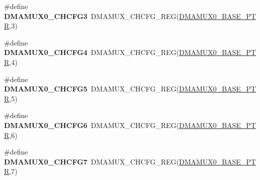 \begin{DoxyCompactItemize}
\item 
\hypertarget{group___d_m_a_m_u_x___register___accessor___macros_ga91901af15d28d4df4369689afa83ed91}{}\#define {\bfseries D\+M\+A\+M\+U\+X0\+\_\+\+C\+H\+C\+F\+G3}~D\+M\+A\+M\+U\+X\+\_\+\+C\+H\+C\+F\+G\+\_\+\+R\+E\+G(\hyperlink{group___d_m_a_m_u_x___peripheral_ga403b61d306820e4e1113c636300004a3}{D\+M\+A\+M\+U\+X0\+\_\+\+B\+A\+S\+E\+\_\+\+P\+T\+R},3)\label{group___d_m_a_m_u_x___register___accessor___macros_ga91901af15d28d4df4369689afa83ed91}

\item 
\hypertarget{group___d_m_a_m_u_x___register___accessor___macros_ga119cc51656d195aff24959e90f717d81}{}\#define {\bfseries D\+M\+A\+M\+U\+X0\+\_\+\+C\+H\+C\+F\+G4}~D\+M\+A\+M\+U\+X\+\_\+\+C\+H\+C\+F\+G\+\_\+\+R\+E\+G(\hyperlink{group___d_m_a_m_u_x___peripheral_ga403b61d306820e4e1113c636300004a3}{D\+M\+A\+M\+U\+X0\+\_\+\+B\+A\+S\+E\+\_\+\+P\+T\+R},4)\label{group___d_m_a_m_u_x___register___accessor___macros_ga119cc51656d195aff24959e90f717d81}

\item 
\hypertarget{group___d_m_a_m_u_x___register___accessor___macros_ga7fef97c2d0c1d43756b5da924f27ff86}{}\#define {\bfseries D\+M\+A\+M\+U\+X0\+\_\+\+C\+H\+C\+F\+G5}~D\+M\+A\+M\+U\+X\+\_\+\+C\+H\+C\+F\+G\+\_\+\+R\+E\+G(\hyperlink{group___d_m_a_m_u_x___peripheral_ga403b61d306820e4e1113c636300004a3}{D\+M\+A\+M\+U\+X0\+\_\+\+B\+A\+S\+E\+\_\+\+P\+T\+R},5)\label{group___d_m_a_m_u_x___register___accessor___macros_ga7fef97c2d0c1d43756b5da924f27ff86}

\item 
\hypertarget{group___d_m_a_m_u_x___register___accessor___macros_gaf889f0ccfcec8a453b59b14b3e17d8ec}{}\#define {\bfseries D\+M\+A\+M\+U\+X0\+\_\+\+C\+H\+C\+F\+G6}~D\+M\+A\+M\+U\+X\+\_\+\+C\+H\+C\+F\+G\+\_\+\+R\+E\+G(\hyperlink{group___d_m_a_m_u_x___peripheral_ga403b61d306820e4e1113c636300004a3}{D\+M\+A\+M\+U\+X0\+\_\+\+B\+A\+S\+E\+\_\+\+P\+T\+R},6)\label{group___d_m_a_m_u_x___register___accessor___macros_gaf889f0ccfcec8a453b59b14b3e17d8ec}

\item 
\hypertarget{group___d_m_a_m_u_x___register___accessor___macros_ga5cb14c076f6372f0403111e0020d2d57}{}\#define {\bfseries D\+M\+A\+M\+U\+X0\+\_\+\+C\+H\+C\+F\+G7}~D\+M\+A\+M\+U\+X\+\_\+\+C\+H\+C\+F\+G\+\_\+\+R\+E\+G(\hyperlink{group___d_m_a_m_u_x___peripheral_ga403b61d306820e4e1113c636300004a3}{D\+M\+A\+M\+U\+X0\+\_\+\+B\+A\+S\+E\+\_\+\+P\+T\+R},7)\label{group___d_m_a_m_u_x___register___accessor___macros_ga5cb14c076f6372f0403111e0020d2d57}


\end{DoxyCompactItemize}
